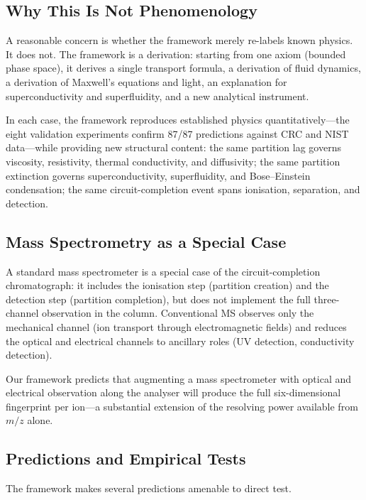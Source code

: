 \documentclass[twocolumn,10pt,a4paper]{article}
\theoremstyle{definition}
\theoremstyle{remark}
\begin{document}
\subsection{Why This Is Not Phenomenology}

A reasonable concern is whether the framework merely re-labels known physics. It does not. The framework is a derivation: starting from one axiom (bounded phase space), it derives a single transport formula, a derivation of fluid dynamics, a derivation of Maxwell's equations and light, an explanation for superconductivity and superfluidity, and a new analytical instrument.

In each case, the framework reproduces established physics quantitatively---the eight validation experiments confirm 87/87 predictions against CRC and NIST data---while providing new structural content: the same partition lag governs viscosity, resistivity, thermal conductivity, and diffusivity; the same partition extinction governs superconductivity, superfluidity, and Bose--Einstein condensation; the same circuit-completion event spans ionisation, separation, and detection.

\subsection{Mass Spectrometry as a Special Case}

A standard mass spectrometer is a special case of the circuit-completion chromatograph: it includes the ionisation step (partition creation) and the detection step (partition completion), but does not implement the full three-channel observation in the column. Conventional MS observes only the mechanical channel (ion transport through electromagnetic fields) and reduces the optical and electrical channels to ancillary roles (UV detection, conductivity detection).

Our framework predicts that augmenting a mass spectrometer with optical and electrical observation along the analyser will produce the full six-dimensional fingerprint per ion---a substantial extension of the resolving power available from $m/z$ alone.

\subsection{Predictions and Empirical Tests}

The framework makes several predictions amenable to direct test.
\end{document}
